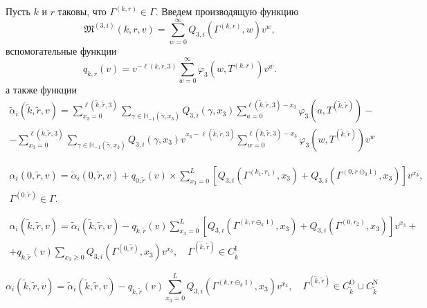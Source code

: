 \documentclass[a4paper,12pt,russian]{extarticle}
\begin{document}
Пусть $k$ и $r$ таковы, что $\Gamma^{(k,r)}\in \Gamma$. Введем производящую функцию
\begin{equation*}
\mathfrak{M}^{(3,i)}(k,r,v) = \sum_{w=0}^{\infty} Q_{3,i}(\Gamma^{(k,r)},w) v^w,
\end{equation*}
вспомогательные функции
\begin{equation*}
q_{k,r}(v) = v^{-\ell(k,r,3)}\sum_{w=0}^{\infty} \varphi_3(w,T^{(k,r)})v^w.
\end{equation*}
а также функции
\begin{multline}
\tilde{\alpha}_i(\tilde{k},\tilde{r},v) = \sum_{x_3=0}^{\ell(\tilde{k},\tilde{r},3)}\sum_{\gamma \in {\mathbb H}_{-1}(\tilde{\gamma},x_3)} Q_{3,i}(\gamma,x_3) \sum_{a=0}^{\ell(\tilde{k},\tilde{r},3) - x_3} \varphi_3(a,T^{(\tilde{k},\tilde{r})}) - \\
- \sum_{x_3=0}^{\ell(\tilde{k},\tilde{r},3)}  \sum_{\gamma \in {\mathbb H}_{-1}(\tilde{\gamma},x_3)} Q_{3,i}(\gamma,x_3) v^{x_3-\ell(\tilde{k},\tilde{r},3)}  \sum_{w=0}^{\ell(\tilde{k},\tilde{r},3) -x_3}
\varphi_3(w,T^{(\tilde{k},\tilde{r})}) v^w
\end{multline}

\begin{multline}
\alpha_i(0,\tilde{r},v) =\tilde{\alpha}_i(0,\tilde{r},v) + q_{0,\tilde{r}}(v) \times \sum_{x_3=0}^{L} \left[ Q_{3,i}(\Gamma^{(k_1,r_1)},x_3) + Q_{3,i}(\Gamma^{(0,r\ominus_0 1)},x_3) \right] v^{x_3}, \\ \Gamma^{(0,\tilde{r})} \in \Gamma.
\end{multline}

\begin{multline}
\alpha_i(\tilde{k},\tilde{r},v) =\tilde{\alpha}_i(\tilde{k},\tilde{r},v) - q_{\tilde{k},\tilde{r}}(v)\sum_{x_3=0}^{L} \left[ Q_{3,i}(\Gamma^{(k,r\ominus_k 1)},x_3) + Q_{3,i}(\Gamma^{(0,r_2)},x_3) \right] v^{x_3}+ \\ 
+ q_{\tilde{k},\tilde{r}}(v)  \sum_{x_3\geqslant 0} Q_{3,i}(\Gamma^{(0,\tilde{r})},x_3) v^{x_3}, \quad \Gamma^{(\tilde{k}, \tilde{r})} \in C_{\tilde{k}}^{\mathrm{I}}
\end{multline}

\begin{equation}
\alpha_i(\tilde{k},\tilde{r},v) =\tilde{\alpha}_i(\tilde{k},\tilde{r},v) - q_{\tilde{k},\tilde{r}}(v) \sum_{x_3=0}^{L} Q_{3,i}(\Gamma^{(k,r\ominus_k 1)},x_3) v^{x_3} , \quad \Gamma^{(\tilde{k}, \tilde{r})} \in C_{\tilde{k}}^{\mathrm{O}} \cup C_{\tilde{k}}^{\mathrm{N}}
\end{equation}
\end{document}
